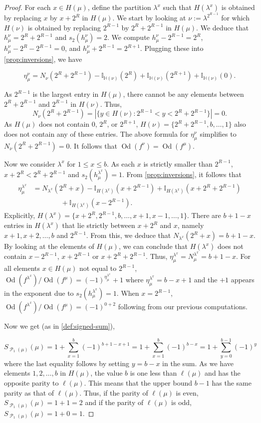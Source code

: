 \documentclass[12pt]{amsart}
\theoremstyle{definition}
\numberwithin{equation}{section}
\newcommand{\la}{\lambda}
\DeclareMathOperator{\p}{\mathcal{P}}
\DeclareMathOperator{\Od}{Od}
\begin{document}
\begin{proof}
For each $x\in H(\mu)$, define the partition $\la^x$ such that $H(\la^x)$ is obtained by replacing $x$ by $x+2^R$ in $H(\mu)$. We start by looking at $\nu:= \la^{2^{R-1}}$ for which $H(\nu)$ is obtained by replacing $2^{R-1}$ by $2^R + 2^{R-1}$ in $H(\mu)$. We deduce that $h^\nu_\mu = 2^R + 2^{R-1}$ and $s_2(h^\nu_\mu) = 2$. We compute $h^\nu_\mu - 2^{R-1} = 2^R$, $h^\nu_\mu - 2^R - 2^{R-1} = 0$, and $h^\nu_\mu+ 2^{R-1} = 2^{R+1}$.
Plugging these into \cref{prop:inversions}, we have

\[
\eta^\nu_\mu = N_\nu(2^R + 2^{R-1}) - \mathbb{I_{H(\nu)}}(2^R) + \mathbb{I_{H(\nu)}}(2^{R+1}) + \mathbb{I_{H(\nu)}}(0).
\]

As $2^{R-1}$ is the largest entry in $H(\mu)$, there cannot be any elements between $2^R + 2^{R-1}$ and $2^{R-1}$ in $H(\nu)$. Thus,
\[N_\nu(2^R + 2^{R-1}) = |\{y\in H(\nu) :  2^{R-1}< y < 2^{R}+2^{R-1}\}|=0.\] 
As $H(\mu)$ does not contain 0, $2^R$, or $2^{R+1}$, $H(\nu) = \{2^R + 2^{R-1}, b, \ldots, 1\}$ also does not contain any of these entries. The above formula for $\eta^\nu_\mu$ simplifies to $N_\nu(2^R + 2^{R-1})=0$. It follows that  $\Od(f^\nu) = \Od(f^\mu)$. 

Now we consider $\la^x$ for  $1\leq x \leq b$. As each $x$ is strictly smaller than $2^{R-1}$, $x + 2^R < 2^{R} + 2^{R-1}$ and $s_2(h^{\la^x}_\mu) = 1$. From \cref{prop:inversions}, it follows that
\begin{align*}
\eta^{\la^x}_\mu &= N_{\la^x}(2^R + x) - \mathbb{I}_{H(\la^x)}(x + 2^{R-1}) + \mathbb{I}_{H(\la^x)}(x + 2^R + 2^{R-1}) \\&\qquad\qquad+ \mathbb{I}_{H(\la^x)}(x - 2^{R-1}).
\end{align*}
Explicitly, $H(\la^x) = \{x + 2^R, 2^{R-1},b,\ldots, x+1, x-1, \ldots ,1\}$. There are $b+1-x$ entries in $H(\la^x)$ that lie strictly between $x+2^R$ and $x$, namely $x+1, x+2, \ldots, b$ and $2^{R-1}$.  From this, we deduce that $N_{\la^x}(2^R + x) = b+1-x$. By looking at the elements of $H(\mu)$, we can conclude that $H(\la^x)$ does not contain $ x - 2^{R-1}$, $x+2^{R-1}$ or $x + 2^{R} + 2^{R-1}$. Thus, $\eta^{\la^x}_\mu = N_{\mu}^{\la^x} = b + 1 - x$. 
For all elements $x\in H(\mu)$ not equal to $2^{R-1}$, $\Od(f^{\la^x})/\Od(f^\mu) = (-1)^{\eta^{\la^x}_\mu}+1$ where $\eta^{\la^x}_\mu = b-x + 1$ and the $+1$ appears in the exponent due to $s_2(h^{\la^x}_\mu) = 1$. When $x = 2^{R-1}$, $\Od(f^{\la^x})/\Od(f^\mu) = (-1)^{0+2}$ following from our previous computations.

Now we get (as in \cref{def:signed-sum}), 

\[
S_{\p_1(\mu)}({\mu}) = 1 + \sum\limits_{x=1}^{b} (-1)^{b + 1 - x + 1} = 1 + \sum\limits_{x=1}^{b} (-1)^{b - x} 
= 1 + \sum\limits_{y=0}^{b-1} (-1)^y
\]
where the last equality follows by setting $y = b-x$ in the sum. As we have elements $1,2,\ldots, b$ in $H(\mu)$, the value $b$ is one less than $\ell(\mu)$ and has the opposite parity to $\ell(\mu)$. This means that the upper bound $b-1$ has the same parity as that of $\ell(\mu)$. Thus, if the parity of $\ell(\mu)$ is even, $S_{\p_1(\mu)}(\mu) = 1+1 =2$ and if the parity of $\ell(\mu)$ is odd, $S_{\p_1(\mu)}(\mu) = 1+0 =1$.
\end{proof}
\end{document}
